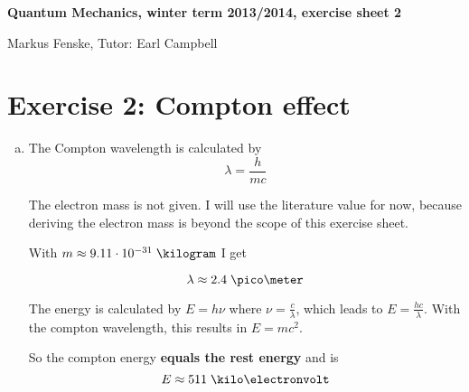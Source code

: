 \documentclass[a4paper,german,12pt,smallheadings]{scrartcl}
\begin{document}
\begin{center}
\bfseries %
\sffamily %
\vspace{-40pt}
Quantum Mechanics, winter term 2013/2014, exercise sheet 2

Markus Fenske, Tutor: Earl Campbell
\vspace{-10pt}
\end{center}

\section*{Exercise 2: Compton effect}

\begin{enumerate}[a)]
  \item
    The Compton wavelength is calculated by
    \begin{equation*}
      \lambda = \frac{h}{mc}
    \end{equation*}

    The electron mass is not given. I will use the literature value for now,
    because deriving the electron mass is beyond the scope of this exercise
    sheet.

    With $m \approx 9.11 \cdot 10^{-31} \; \kilogram$ I get

    \begin{equation*}
      \lambda \approx 2.4 \; \pico\meter
    \end{equation*}

    The energy is calculated by $E = h \nu$ where $\nu = \frac{c}{\lambda}$,
    which leads to $E = \frac{hc}{\lambda}$. With the compton wavelength, this
    results in $E=mc^2$.

    So the compton energy \textbf{equals the rest energy} and is
    \begin{equation*}
      E \approx 511 \; \kilo\electronvolt
    \end{equation*}
\end{enumerate}
\end{document}
